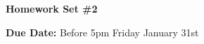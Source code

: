 
\usepackage{braket}

\def\ketY{\ensuremath{\ket {\Psi}}}
\def\iGeV{\ensuremath{\textrm{GeV}^{-1}}}
\def\mp{\ensuremath{m_{\textrm{proton}}}}
\def\rp{\ensuremath{r_{\textrm{proton}}}}
\def\me{\ensuremath{m_{\textrm{electron}}}}
\def\aG{\ensuremath{\alpha_G}}
\def\rAtom{\ensuremath{r_{\textrm{atom}}}}
\def\rNucl{\ensuremath{r_{\textrm{nucleus}}}}
\def\GN{\ensuremath{\textrm{G}_\textrm{N}}}

\def\be{\begin{equation*}}
\def\ee{\end{equation*}}


\usepackage{fancyhdr}

\fancyhf{}

\thispagestyle{fancy}






\begin{center}
{\huge \textbf{Homework Set \#2}}
\large

{\textbf{ Due Date:} Before 5pm Friday January 31st  }
\end{center}

